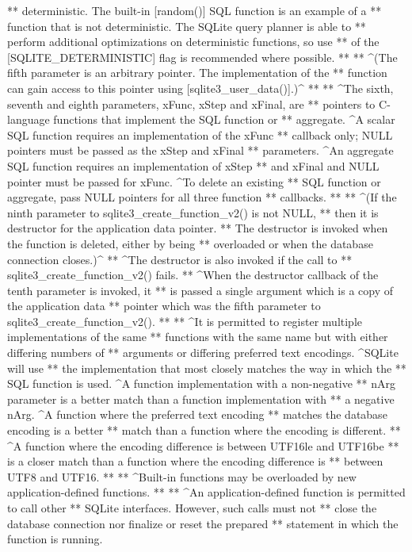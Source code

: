 \begin{Codex}[label=sqlite3.h,numbers=left]
{** deterministic.  The built-in [random()] SQL function is an example of a
** function that is not deterministic.  The SQLite query planner is able to
** perform additional optimizations on deterministic functions, so use
** of the [SQLITE_DETERMINISTIC] flag is recommended where possible.
**
** ^(The fifth parameter is an arbitrary pointer.  The implementation of the
** function can gain access to this pointer using [sqlite3_user_data()].)^
**
** ^The sixth, seventh and eighth parameters, xFunc, xStep and xFinal, are
** pointers to C-language functions that implement the SQL function or
** aggregate. ^A scalar SQL function requires an implementation of the xFunc
** callback only; NULL pointers must be passed as the xStep and xFinal
** parameters. ^An aggregate SQL function requires an implementation of xStep
** and xFinal and NULL pointer must be passed for xFunc. ^To delete an existing
** SQL function or aggregate, pass NULL pointers for all three function
** callbacks.
**
** ^(If the ninth parameter to sqlite3_create_function_v2() is not NULL,
** then it is destructor for the application data pointer. 
** The destructor is invoked when the function is deleted, either by being
** overloaded or when the database connection closes.)^
** ^The destructor is also invoked if the call to
** sqlite3_create_function_v2() fails.
** ^When the destructor callback of the tenth parameter is invoked, it
** is passed a single argument which is a copy of the application data 
** pointer which was the fifth parameter to sqlite3_create_function_v2().
**
** ^It is permitted to register multiple implementations of the same
** functions with the same name but with either differing numbers of
** arguments or differing preferred text encodings.  ^SQLite will use
** the implementation that most closely matches the way in which the
** SQL function is used.  ^A function implementation with a non-negative
** nArg parameter is a better match than a function implementation with
** a negative nArg.  ^A function where the preferred text encoding
** matches the database encoding is a better
** match than a function where the encoding is different.  
** ^A function where the encoding difference is between UTF16le and UTF16be
** is a closer match than a function where the encoding difference is
** between UTF8 and UTF16.
**
** ^Built-in functions may be overloaded by new application-defined functions.
**
** ^An application-defined function is permitted to call other
** SQLite interfaces.  However, such calls must not
** close the database connection nor finalize or reset the prepared
** statement in which the function is running.
}
\end{Codex}
